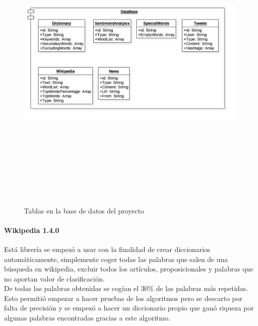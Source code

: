 \documentclass[../all.tex]{subfiles}
\begin{document}
        \begin{figure}[H]
        \centering
            \includegraphics[height=15cm, width=15cm]{imgs/DB.png}
            \caption{Tablas en la base de datos del proyecto}
        \end{figure}
	    \paragraph{Wikipedia 1.4.0}
		    Está librería se empezó a usar con la finalidad de crear diccionarios automáticamente, simplemente coger todas las palabras que salen de una búsqueda en wikipedia, excluir todos los artículos, proposicionales y palabras que no aportan valor de clasificación.\\
		    
		    De todas las palabras obtenidas se cogían el 30\% de las palabras más repetidas. Esto permitió empezar a hacer pruebas de los algoritmos pero se descarto por falta de precisión y se empezó a hacer un diccionario propio que ganó riqueza por algunas palabras encontradas gracias a este algoritmo\cite{PyWiki}.
    	\newpage
\end{document}
